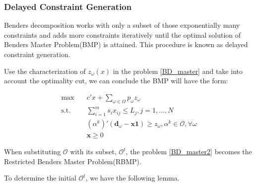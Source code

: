 \subsubsection{Delayed Constraint Generation}\label{bender_stage}
Benders decomposition works with only a subset of those exponentially many constraints and adds more constraints iteratively until the optimal solution of Benders Master Problem(BMP) is attained. This procedure is known as delayed constraint generation.

Use the characterization of $z_{\omega}(x)$ in the problem \eqref{BD_master} and take into account the optimality cut, we can conclude the BMP will have the form:

\begin{equation}\label{BD_master2}
  \begin{aligned}
    \max \quad & c{'} x + \sum_{\omega \in \Omega} p_{\omega} z_{\omega} \\
    \text {s.t.} \quad & \sum_{i=1}^{m} s_{i} x_{ij} \leq L_j, j =1,\ldots, N \\
    & (\alpha^{k}){'}(\mathbf{d}_{\omega}- \mathbf{x} \mathbf{1}) \geq z_{\omega}, \alpha^k \in \mathcal{O}, \forall \omega \\
     & \mathbf{x} \geq 0
  \end{aligned}
\end{equation}

When substituting $\mathcal{O}$ with its subset, $\mathcal{O}^{t}$, the problem \eqref{BD_master2} becomes the Restricted Benders Master Problem(RBMP). 





To determine the initial $\mathcal{O}^{t}$, we have the following lemma.

